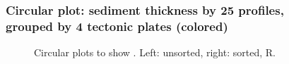 \documentclass[pdflatex,compress,10pt,
	xcolor={dvipsnames,dvipsnames,svgnames,x11names,table},
	hyperref={colorlinks = true,breaklinks = true, urlcolor = NavyBlue, breaklinks = true}]{beamer}
\begin{document}
\begin{frame}\frametitle{Circular plot: sediment thickness by 25 profiles, \\grouped by 4 tectonic plates (colored)}
\begin{figure}[H]
	\centering
			\hspace{5mm}
		\caption{Circular plots to show . Left: unsorted, right: sorted, R.}
\end{figure}		
\end{frame}
\end{document}
